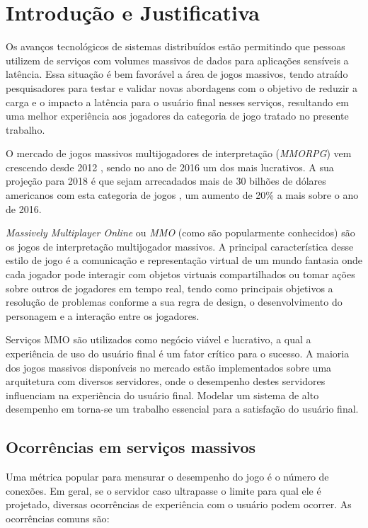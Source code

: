 \section{Introdução e Justificativa}
\label{sec:int}

Os avanços tecnológicos de sistemas distribuídos estão permitindo que pessoas utilizem de serviços com volumes massivos de dados para aplicações sensíveis a latência. Essa situação é bem favorável a área de jogos massivos, tendo atraído pesquisadores para testar e validar novas abordagens com o objetivo de reduzir a carga e o impacto a latência para o usuário final nesses serviços, resultando em uma melhor experiência aos jogadores da categoria de jogo tratado no presente trabalho\cite{mmo_analytic}.

O mercado de jogos massivos multijogadores de interpretação (\textit{MMORPG}) vem crescendo desde 2012 \cite{new_york_times}, sendo no ano de 2016 um dos mais lucrativos\cite{statista_2016}. A sua projeção para 2018 é que sejam arrecadados mais de 30 bilhões de dólares americanos com esta categoria de jogos \cite{statista_2018}, um aumento de 20\% a mais sobre o ano de 2016.

\textit{Massively Multiplayer Online} ou \textit{MMO} (como são popularmente conhecidos) são os jogos de interpretação multijogador massivos. A principal característica desse estilo de jogo é a comunicação e representação virtual de um mundo fantasia onde cada jogador pode interagir com objetos virtuais compartilhados ou tomar ações sobre outros de jogadores em tempo real, tendo como principais objetivos a resolução de problemas conforme a sua regra de design, o desenvolvimento do personagem e a interação entre os jogadores\cite{video_game_technologies}.

Serviços MMO são utilizados como negócio viável e lucrativo, a qual a experiência de uso do usuário final é um fator crítico para o sucesso. A maioria dos jogos massivos disponíveis no mercado estão implementados sobre uma arquitetura com diversos servidores, onde o desempenho destes servidores influenciam na experiência do usuário final. Modelar um sistema de alto desempenho em torna-se um trabalho essencial para a satisfação do usuário final\cite{1417630}.

\subsection{Ocorrências em serviços massivos}

Uma métrica popular para mensurar o desempenho do jogo é o número de conexões. Em geral, se o servidor caso ultrapasse o limite para qual ele é projetado, diversas ocorrências de experiência com o usuário podem ocorrer. As ocorrências comuns são\cite{1417630}:

